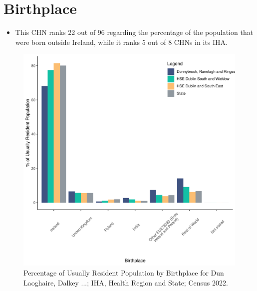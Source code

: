 \documentclass{article}
\begin{document}
\section{Birthplace}\label{sect:Birth}
\begin{itemize}
\item This CHN ranks  22 out of 96 regarding the percentage of the population that were born outside Ireland, while it ranks  5 out of 8 CHNs in its IHA.
\end{itemize}
\begin{figure}[H]
	\centering
	\includegraphics[width = 130mm]{../figures/BirthED.pdf}
	\caption{Percentage of Usually Resident Population by Birthplace for Dun Laoghaire, Dalkey ...; IHA, Health Region and State; Census 2022.}
	\label{fig:vbnv}
	\end{figure}
	
\end{document}
